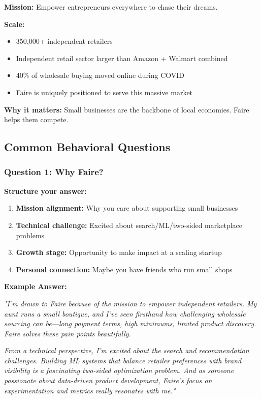 \documentclass[11pt,letterpaper]{article}
\begin{document}
\textbf{Mission:} Empower entrepreneurs everywhere to chase their dreams.

\textbf{Scale:}
\begin{itemize}
    \item 350,000+ independent retailers
    \item Independent retail sector larger than Amazon + Walmart combined
    \item 40\% of wholesale buying moved online during COVID
    \item Faire is uniquely positioned to serve this massive market
\end{itemize}

\textbf{Why it matters:} Small businesses are the backbone of local economies. Faire helps them compete.

\subsection{Common Behavioral Questions}

\subsubsection{Question 1: Why Faire?}

\textbf{Structure your answer:}
\begin{enumerate}
    \item \textbf{Mission alignment:} Why you care about supporting small businesses
    \item \textbf{Technical challenge:} Excited about search/ML/two-sided marketplace problems
    \item \textbf{Growth stage:} Opportunity to make impact at a scaling startup
    \item \textbf{Personal connection:} Maybe you have friends who run small shops
\end{enumerate}

\textbf{Example Answer:}

\textit{"I'm drawn to Faire because of the mission to empower independent retailers. My aunt runs a small boutique, and I've seen firsthand how challenging wholesale sourcing can be—long payment terms, high minimums, limited product discovery. Faire solves these pain points beautifully.}

\textit{From a technical perspective, I'm excited about the search and recommendation challenges. Building ML systems that balance retailer preferences with brand visibility is a fascinating two-sided optimization problem. And as someone passionate about data-driven product development, Faire's focus on experimentation and metrics really resonates with me."}
\end{document}
